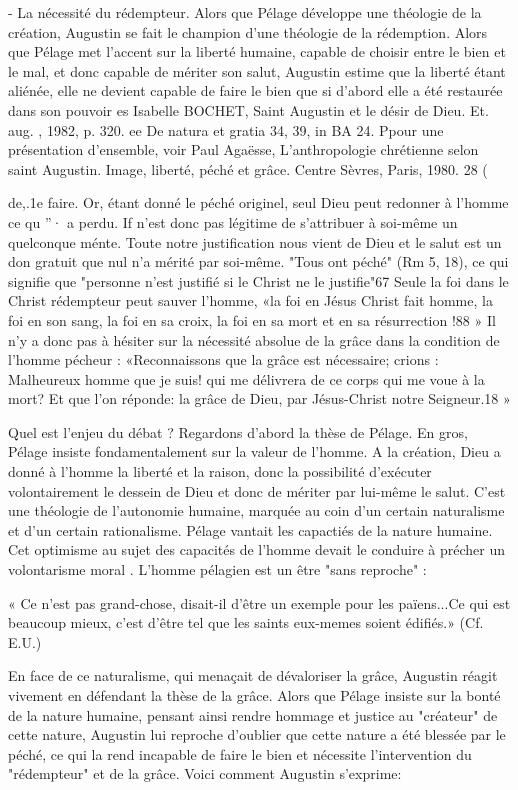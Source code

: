 -	La nécessité du rédempteur. Alors que Pélage développe une théologie de la création, Augustin se fait le champion d'une théologie de la rédemption. Alors que Pélage met l'accent sur la liberté humaine, capable de choisir entre le bien et le mal, et donc capable de mériter son salut, Augustin estime que la liberté étant aliénée, elle ne devient capable de faire le bien que si d'abord elle a été restaurée dans son pouvoir
es Isabelle BOCHET, Saint Augustin et le désir de Dieu. Et. aug. , 1982, p. 320.
ee De natura et gratia 34, 39, in BA 24. Ppour une présentation d'ensemble, voir Paul Agaësse, L'anthropologie chrétienne selon saint Augustin. Image, liberté, péché et grâce. Centre Sèvres, Paris, 1980.
28	(
 
de,.1e faire. Or, étant donné le péché originel, seul Dieu peut redonner à l'homme ce qu ''· a perdu. If n'est donc pas légitime de s'attribuer à soi-même un quelconque ménte. Toute notre justification nous vient de Dieu et le salut est un don gratuit que nul n'a mérité par soi-même. "Tous ont péché" (Rm 5, 18), ce qui signifie que "personne n'est justifié si le Christ ne le justifie"67   Seule la foi dans le Christ rédempteur peut sauver l'homme, «la foi en Jésus Christ fait homme, la foi en son sang, la foi en sa croix, la foi en sa mort et en sa résurrection !88 » Il n'y a donc pas à hésiter sur la nécessité absolue de la grâce dans la condition de l'homme pécheur :
«Reconnaissons que la grâce est nécessaire; crions : Malheureux homme que je suis! qui me délivrera de ce corps qui me voue à la mort? Et que l'on réponde: la grâce de Dieu, par Jésus-Christ notre Seigneur.18 »

Quel est l'enjeu du débat ? Regardons d'abord la thèse	de Pélage. En gros, Pélage insiste fondamentalement sur la valeur de l'homme. A la création, Dieu a donné à l'homme la liberté et la raison, donc la possibilité d'exécuter volontairement le dessein de Dieu et donc de mériter par lui-même le salut. C'est une théologie de l'autonomie humaine, marquée au coin d'un certain naturalisme et d'un certain rationalisme. Pélage vantait les capactiés de la nature humaine. Cet optimisme au sujet des capacités de l'homme devait le conduire	à précher un volontarisme moral . L'homme pélagien est un être "sans reproche" :

« Ce n'est pas grand-chose, disait-il d'être un exemple pour les païens...Ce qui est beaucoup mieux, c'est d'être tel que les saints eux-memes soient édifiés.» (Cf. E.U.)

En face de ce naturalisme, qui menaçait de dévaloriser la grâce, Augustin réagit vivement en défendant la thèse de la grâce. Alors que Pélage insiste sur la bonté de la nature humaine, pensant ainsi rendre hommage et justice au "créateur" de cette nature, Augustin lui reproche d'oublier que cette nature a été blessée par le péché, ce qui la rend incapable de faire le bien et nécessite l'intervention du "rédempteur" et de la grâce. Voici comment Augustin s'exprime:

